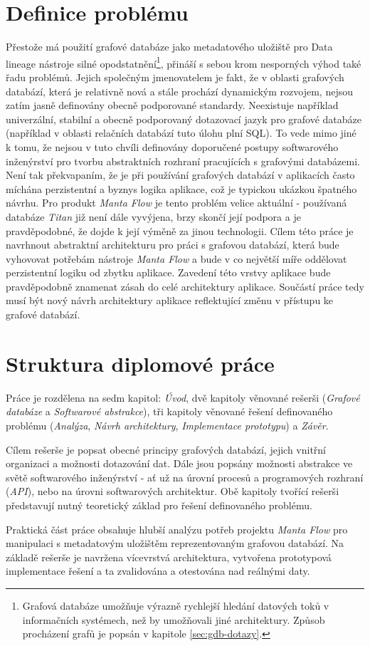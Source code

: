 \section{Definice problému}
Přestože má použití grafové databáze jako metadatového uložiště pro Data lineage nástroje silné opodstatnění\footnote{Grafová databáze umožňuje výrazně rychlejší hledání datových toků v informačních systémech, než by umožňovali jiné architektury. Způsob procházení grafů je popsán v kapitole \ref{sec:gdb-dotazy}.}, přináší s sebou krom nesporných výhod také řadu problémů. Jejich společným jmenovatelem je fakt, že v oblasti grafových databází, která je relativně nová a stále prochází dynamickým rozvojem, nejsou zatím jasně definovány obecně podporované standardy. Neexistuje například univerzální, stabilní a obecně podporovaný dotazovací jazyk pro grafové databáze (například v oblasti relačních databází tuto úlohu plní SQL). To vede mimo jiné k tomu, že nejsou v tuto chvíli definovány doporučené postupy softwarového inženýrství pro tvorbu abstraktních rozhraní pracujících s grafovými databázemi. Není tak překvapaním, že je při používání grafových databází v aplikacích často míchána perzistentní a byznys logika aplikace, což je typickou ukázkou špatného návrhu\cite{Taylor09}. Pro produkt \textit{Manta Flow} je tento problém velice aktuální - používaná databáze \textit{Titan} již není dále vyvýjena, brzy skončí její podpora \cite{Titan04} a je pravděpodobné, že dojde k její výměně za jinou technologii. Cílem této práce je navrhnout abstraktní architekturu pro práci s grafovou databází, která bude vyhovovat potřebám nástroje \textit{Manta Flow} a bude v co největší míře oddělovat perzistentní logiku od zbytku aplikace. Zavedení této vrstvy aplikace bude pravděpodobně znamenat zásah do celé architektury aplikace. Součástí práce tedy musí být nový návrh architektury aplikace reflektující změnu v přístupu ke grafové databází.

\section{Struktura diplomové práce}
Práce je rozdělena na sedm kapitol: \textit{Úvod}, dvě kapitoly věnované rešerši (\textit{Grafové databáze} a \textit{Softwarové abstrakce}), tři kapitoly věnované řešení definovaného problému (\textit{Analýza}, \textit{Návrh architektury}, \textit{Implementace prototypu}) a \textit{Závěr}.

Cílem rešerše je popsat obecné principy grafových databází, jejich vnitřní organizaci a možnosti dotazování dat. Dále jsou popsány možnosti abstrakce ve světě softwarového inženýrství - ať už na úrovní procesů a programových rozhraní (\textit{API}), nebo na úrovni softwarových architektur. Obě kapitoly tvořící rešerši představují nutný teoretický základ pro řešení definovaného problému.

Praktická část práce obsahuje hlubší analýzu potřeb projektu \textit{Manta Flow} pro manipulaci s metadatovým uložištěm reprezentovaným grafovou databází. Na základě rešerše je navržena vícevrstvá architektura, vytvořena prototypová implementace řešení a ta zvalidována a otestována nad reálnými daty.

